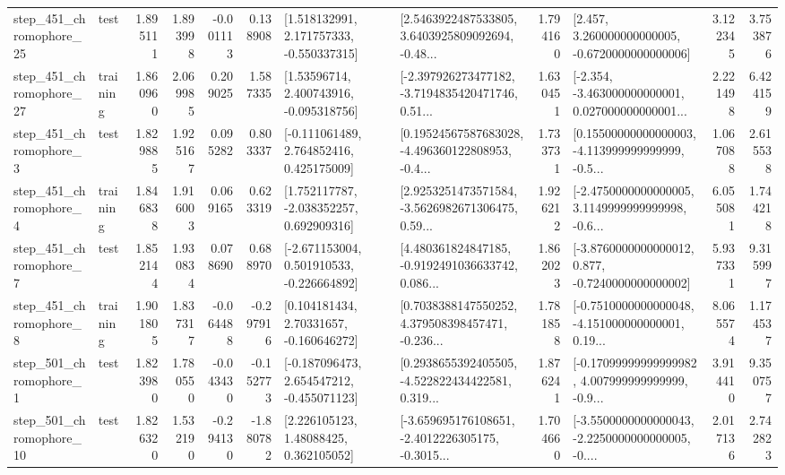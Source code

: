 \begin{tabular}{llrrrrllrlrr}
  step\_451\_chromophore\_25 &      test &      1.895111 &    1.893998 &     -0.001113 &  0.138908 &    [1.518132991, 2.171757333, -0.550337315] &  [2.5463922487533805, 3.6403925809092694, -0.48... &       1.794160 &    [2.457, 3.260000000000005, -0.6720000000000006] &            3.122345 &          3.753876 \\
  step\_451\_chromophore\_27 &  training &      1.860960 &    2.069985 &      0.209025 &  1.587335 &     [1.53596714, 2.400743916, -0.095318756] &  [-2.397926273477182, -3.7194835420471746, 0.51... &       1.630451 &  [-2.354, -3.463000000000001, 0.027000000000001... &            2.221498 &          6.424159 \\
   step\_451\_chromophore\_3 &      test &      1.829885 &    1.925167 &      0.095282 &  0.803337 &    [-0.111061489, 2.764852416, 0.425175009] &  [0.19524567587683028, -4.496360122808953, -0.4... &       1.733731 &  [0.15500000000000003, -4.113999999999999, -0.5... &            1.067088 &          2.615538 \\
   step\_451\_chromophore\_4 &  training &      1.846838 &    1.916003 &      0.069165 &  0.623319 &    [1.752117787, -2.038352257, 0.692909316] &  [2.9253251473571584, -3.5626982671306475, 0.59... &       1.926212 &  [-2.4750000000000005, 3.1149999999999998, -0.6... &            6.055081 &          1.744218 \\
   step\_451\_chromophore\_7 &      test &      1.852144 &    1.930834 &      0.078690 &  0.688970 &   [-2.671153004, 0.501910533, -0.226664892] &  [4.480361824847185, -0.9192491036633742, 0.086... &       1.862023 &  [-3.8760000000000012, 0.877, -0.7240000000000002] &            5.937331 &          9.315997 \\
   step\_451\_chromophore\_8 &  training &      1.901805 &    1.837317 &     -0.064488 & -0.297916 &     [0.104181434, 2.70331657, -0.160646272] &  [0.7038388147550252, 4.379508398457471, -0.236... &       1.781858 &  [-0.7510000000000048, -4.151000000000001, 0.19... &            8.065574 &          1.174537 \\
   step\_501\_chromophore\_1 &      test &      1.823980 &    1.780550 &     -0.043430 & -0.152773 &   [-0.187096473, 2.654547212, -0.455071123] &  [0.2938655392405505, -4.522822434422581, 0.319... &       1.876241 &  [-0.17099999999999982, 4.007999999999999, -0.9... &            3.914410 &          9.350757 \\
  step\_501\_chromophore\_10 &      test &      1.826320 &    1.532190 &     -0.294130 & -1.880782 &      [2.226105123, 1.48088425, 0.362105052] &  [-3.659695176108651, -2.4012226305175, -0.3015... &       1.704660 &  [-3.5500000000000043, -2.2250000000000005, -0.... &            2.017136 &          2.742823 \\

\end{tabular}
